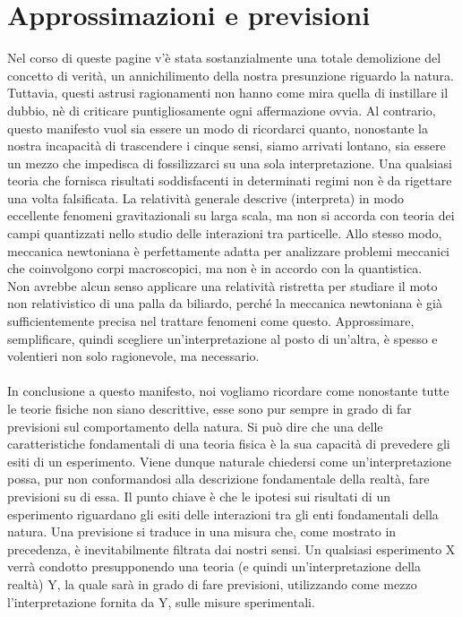 \documentclass[]{article}
\begin{document}
	\section{Approssimazioni e previsioni}
	Nel corso di queste pagine v'è stata sostanzialmente una totale demolizione del concetto di verità, un annichilimento della nostra presunzione riguardo la natura. Tuttavia, questi astrusi ragionamenti non hanno come mira quella di instillare il dubbio, nè di criticare puntigliosamente ogni affermazione ovvia. Al contrario, questo manifesto vuol sia essere un modo di ricordarci quanto, nonostante la nostra incapacità di trascendere i cinque sensi, siamo arrivati lontano, sia essere un mezzo che impedisca di fossilizzarci su una sola interpretazione. Una qualsiasi teoria che fornisca risultati soddisfacenti in determinati regimi non è da rigettare una volta falsificata. La relatività generale descrive (interpreta) in modo eccellente fenomeni gravitazionali su larga scala, ma non si accorda con teoria dei campi quantizzati nello studio delle interazioni tra particelle. Allo stesso modo, meccanica newtoniana è perfettamente adatta per analizzare problemi meccanici che coinvolgono corpi macroscopici, ma non è in accordo con la quantistica.\\
	Non avrebbe alcun senso applicare una relatività ristretta per studiare il moto non relativistico di una palla da biliardo, perché la meccanica newtoniana è già sufficientemente precisa nel trattare fenomeni come questo. Approssimare, semplificare, quindi scegliere un'interpretazione al posto di un'altra, è spesso e volentieri non solo ragionevole, ma necessario.\\
	\\
	In conclusione a questo manifesto, noi vogliamo ricordare come nonostante tutte le teorie fisiche non siano descrittive, esse sono pur sempre in grado di far previsioni sul comportamento della natura.
	Si può dire che una delle caratteristiche fondamentali di una teoria fisica è la sua capacità di prevedere gli esiti di un esperimento. Viene dunque naturale chiedersi come un'interpretazione possa, pur non conformandosi alla descrizione fondamentale della realtà, fare previsioni su di essa. Il punto chiave è che le ipotesi sui risultati di un esperimento riguardano gli esiti delle interazioni tra gli enti fondamentali della natura. Una previsione si traduce in una misura che, come mostrato in precedenza, è inevitabilmente filtrata dai nostri sensi.
	Un qualsiasi esperimento X verrà condotto presupponendo una teoria (e quindi un'interpretazione della realtà) Y, la quale sarà in grado di fare previsioni, utilizzando come mezzo l'interpretazione fornita da Y, sulle misure sperimentali.\\
\end{document}
